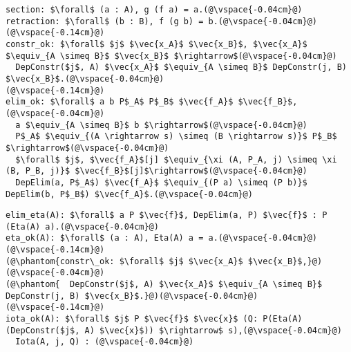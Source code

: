\begin{figure*}
\begin{minipage}{0.43\textwidth}
\begin{lstlisting}
section: $\forall$ (a : A), g (f a) = a.(@\vspace{-0.04cm}@)
retraction: $\forall$ (b : B), f (g b) = b.(@\vspace{-0.04cm}@)
(@\vspace{-0.14cm}@)
constr_ok: $\forall$ $j$ $\vec{x_A}$ $\vec{x_B}$, $\vec{x_A}$ $\equiv_{A \simeq B}$ $\vec{x_B}$ $\rightarrow$(@\vspace{-0.04cm}@)
  DepConstr($j$, A) $\vec{x_A}$ $\equiv_{A \simeq B}$ DepConstr(j, B) $\vec{x_B}$.(@\vspace{-0.04cm}@)
(@\vspace{-0.14cm}@)
elim_ok: $\forall$ a b P$_A$ P$_B$ $\vec{f_A}$ $\vec{f_B}$,(@\vspace{-0.04cm}@)
  a $\equiv_{A \simeq B}$ b $\rightarrow$(@\vspace{-0.04cm}@)
  P$_A$ $\equiv_{(A \rightarrow s) \simeq (B \rightarrow s)}$ P$_B$ $\rightarrow$(@\vspace{-0.04cm}@)
  $\forall$ $j$, $\vec{f_A}$[j] $\equiv_{\xi (A, P_A, j) \simeq \xi (B, P_B, j)}$ $\vec{f_B}$[j]$\rightarrow$(@\vspace{-0.04cm}@)
  DepElim(a, P$_A$) $\vec{f_A}$ $\equiv_{(P a) \simeq (P b)}$ DepElim(b, P$_B$) $\vec{f_A}$.(@\vspace{-0.04cm}@)
\end{lstlisting}
\end{minipage}
\hfill
\begin{minipage}{0.56\textwidth}
\begin{lstlisting}
elim_eta(A): $\forall$ a P $\vec{f}$, DepElim(a, P) $\vec{f}$ : P (Eta(A) a).(@\vspace{-0.04cm}@)
eta_ok(A): $\forall$ (a : A), Eta(A) a = a.(@\vspace{-0.04cm}@)
(@\vspace{-0.14cm}@)
(@\phantom{constr\_ok: $\forall$ $j$ $\vec{x_A}$ $\vec{x_B}$,}@)(@\vspace{-0.04cm}@)
(@\phantom{  DepConstr($j$, A) $\vec{x_A}$ $\equiv_{A \simeq B}$ DepConstr(j, B) $\vec{x_B}$.}@)(@\vspace{-0.04cm}@)
(@\vspace{-0.14cm}@)
iota_ok(A): $\forall$ $j$ P $\vec{f}$ $\vec{x}$ (Q: P(Eta(A) (DepConstr($j$, A) $\vec{x}$)) $\rightarrow$ s),(@\vspace{-0.04cm}@)
  Iota(A, j, Q) : (@\vspace{-0.04cm}@)

\end{lstlisting}
\end{minipage}
\end{figure*}
